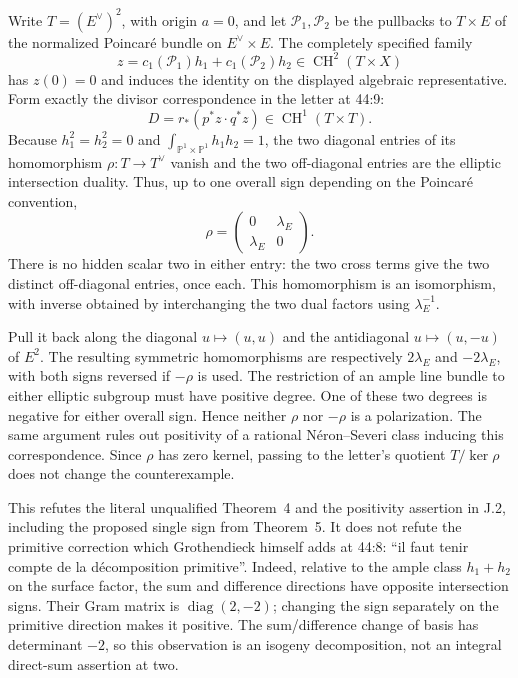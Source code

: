 Write $T=(E^\vee)^2$, with origin $a=0$, and let
$\mathcal P_1,\mathcal P_2$ be the pullbacks to $T\times E$ of
the normalized Poincaré bundle on $E^\vee\times E$.
The completely specified family
\[
 z=c_1(\mathcal P_1)h_1+c_1(\mathcal P_2)h_2
       \in\operatorname{CH}^2(T\times X)
\]
has $z(0)=0$ and induces the identity on the displayed algebraic
representative.  Form exactly the divisor correspondence in the
letter at 44:9:
\[
 D=r_*(p^*z\cdot q^*z)\in\operatorname{CH}^1(T\times T).
\]
Because $h_1^2=h_2^2=0$ and $\int_{\mathbb P^1\times\mathbb P^1}
h_1h_2=1$, the two diagonal entries of its homomorphism
$\rho:T\to T^\vee$ vanish and the two off-diagonal entries are
the elliptic intersection duality.  Thus, up to one overall sign
depending on the Poincaré convention,
\[
 \rho=\begin{pmatrix}0&\lambda_E\\\lambda_E&0\end{pmatrix}.
\]
There is no hidden scalar two in either entry: the two cross terms
give the two distinct off-diagonal entries, once each.
This homomorphism is an isomorphism, with inverse obtained by
interchanging the two dual factors using $\lambda_E^{-1}$.

Pull it back along the diagonal $u\mapsto(u,u)$ and the
antidiagonal $u\mapsto(u,-u)$ of $E^2$.  The resulting symmetric
homomorphisms are respectively $2\lambda_E$ and $-2\lambda_E$,
with both signs reversed if $-\rho$ is used.  The restriction of
an ample line bundle to either elliptic subgroup must have positive
degree.  One of these two degrees is negative for either overall
sign.  Hence neither $\rho$ nor $-\rho$ is a polarization.
The same argument rules out positivity of a rational
Néron--Severi class inducing this correspondence.  Since $\rho$
has zero kernel, passing to the letter's quotient $T/\ker\rho$
does not change the counterexample.

This refutes the literal unqualified Theorem~4 and the positivity
assertion in J.2, including the proposed single sign from
Theorem~5.  It does not refute the primitive correction which
Grothendieck himself adds at 44:8:
``il faut tenir compte de la décomposition primitive''.
Indeed, relative to the ample class $h_1+h_2$ on the surface
factor, the sum and difference directions have opposite
intersection signs.  Their Gram matrix is
$\operatorname{diag}(2,-2)$; changing the sign separately on the
primitive direction makes it positive.  The sum/difference change
of basis has determinant $-2$, so this observation is an isogeny
decomposition, not an integral direct-sum assertion at two.

